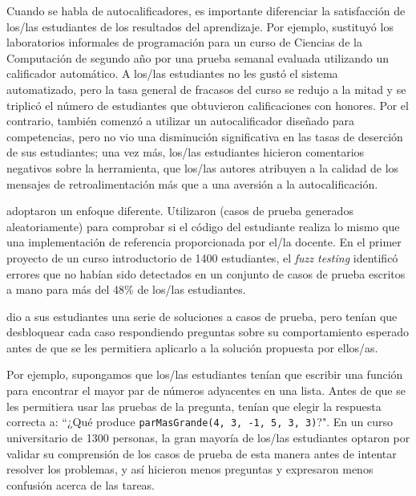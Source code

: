Cuando se habla de autocalificadores, 
es importante diferenciar la satisfacción de los/las estudiantes de los resultados del aprendizaje.
Por ejemplo, 
\cite{Magu2018} sustituyó los laboratorios informales de programación para un curso de Ciencias de la Computación de segundo año por una prueba semanal evaluada utilizando un calificador automático.
A los/las estudiantes no les gustó el sistema automatizado, 
pero la tasa general de fracasos del curso se redujo a la mitad 
y se triplicó el número de estudiantes que obtuvieron calificaciones con honores.
Por el contrario, 
\cite{Rubi2014} también comenzó a utilizar un autocalificador diseñado para competencias, pero no vio una disminución significativa en las tasas de deserción de sus estudiantes;
una vez más, 
los/las estudiantes hicieron comentarios negativos sobre la herramienta, 
que los/las autores atribuyen a la calidad de los mensajes de retroalimentación más que a una aversión a la autocalificación.

\cite{Srid2016} adoptaron un enfoque diferente.
Utilizaron  
(casos de prueba generados aleatoriamente) 
para comprobar si el código del estudiante realiza lo mismo que una implementación de referencia proporcionada por el/la docente.
En el primer proyecto de un curso introductorio de 1400 estudiantes, el \emph{fuzz testing} identificó errores que no habían sido detectados en un conjunto de casos de prueba escritos a mano para más del 48\% de los/las estudiantes.

\cite{Basu2015} dio a sus estudiantes una serie de soluciones a casos de prueba, 
pero tenían que desbloquear cada caso respondiendo preguntas sobre su comportamiento esperado
antes de que se les permitiera aplicarlo a la solución propuesta por ellos/as.

Por ejemplo, 
supongamos que los/las estudiantes tenían que escribir una función para encontrar el mayor par de números adyacentes en una lista. Antes de que se les permitiera usar las pruebas de la pregunta, tenían que elegir la respuesta correcta a: ``¿Qué produce \texttt{parMasGrande(4, 3, -1, 5, 3, 3)}?".
En un curso universitario de 1300 personas, 
la gran mayoría de los/las estudiantes optaron por validar su comprensión de los casos de prueba de esta manera 
antes de intentar resolver los problemas, 
y así hicieron menos preguntas y expresaron menos confusión acerca de las tareas.

